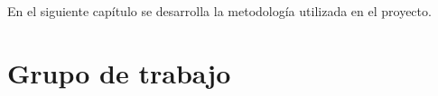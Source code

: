 En el siguiente capítulo se desarrolla la metodología utilizada en el proyecto.

\section{Grupo de trabajo}

